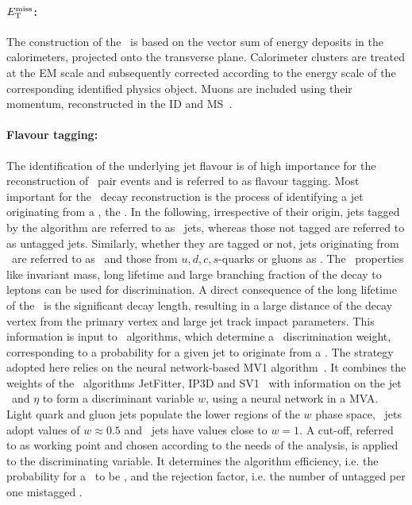 %
\paragraph{\boldmath$E_\mathrm{T}^\mathrm{miss}$:}\mbox{}
The construction of the \met\ is based on the vector sum of energy deposits in the calorimeters, projected onto the transverse plane. 
%
Calorimeter clusters are treated at the \gls{EM} scale and subsequently corrected according to the energy scale of the corresponding identified physics object. Muons are included using their momentum, reconstructed in the \gls{ID} and \gls{MS}~\cite{ATLAS-MET-NEW}. 



%
\paragraph{Flavour tagging:}\mbox{}
The identification of the underlying jet flavour is of high importance for the reconstruction of \tquark\ pair events and is referred to as flavour tagging. 
%
Most important for the \ttbar\ decay reconstruction is the process of identifying a jet originating from a \bquark, the \btag. 
%
In the following, irrespective of their origin, jets tagged by the algorithm are referred to as \btagged\ jets, whereas those not tagged are referred to as untagged jets. 
%
Similarly, whether they are tagged or not, jets originating from \ are referred to as \ and those from $u, d, c, s$-quarks or gluons as .
%
The \bhadron\ properties like invariant mass, long lifetime and large branching fraction of the decay to leptons can be used for discrimination. A direct consequence of the long lifetime of the \bhadron\ is the significant decay length, resulting in a large distance of the decay vertex from the primary vertex and large jet track impact parameters. This information is input to \btag\ algorithms, which determine a \btag\ discrimination weight, corresponding to a probability for a given jet to originate from a \bquark. 
%
The strategy adopted here relies on the neural network-based MV1 algorithm~\cite{Aad:2015ydr}. It combines the weights of the \btag\ algorithms JetFitter, IP3D and SV1~\cite{Aad:2015ydr} with information on the jet \pt\ and $\eta$ to form a discriminant variable $w$, using a neural network in a \gls{MVA}. Light quark and gluon jets populate the lower regions of the $w$ phase space, \cflavoured\ jets adopt values of $w\approx0.5$ and \bflavoured\ jets have values close to $w=1$. A cut-off, referred to as working point and chosen according to the needs of the analysis, is applied to the discriminating variable. It determines the algorithm efficiency, i.e. the probability for a \bjet\ to be \btagged, and the rejection factor, i.e. the number of untagged  per one mistagged \ljet. 
